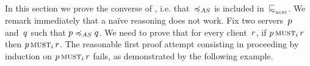 


In this section we prove the converse of ,
i.e. that~$\asleq$ is included in~$\testleqS$. 
We remark immediately that a naïve reasoning does not work.
Fix two servers~$p$ and~$q$ such that $\serverA \asleq \serverB$.
We need to prove that for every client~$r$, if
$\musti{\server}{\client}$ then $\musti{\serverA}{\client}$.
The reasonable first proof attempt consisting in proceeding by induction on
$\musti{\server}{\client}$ fails, as demonstrated by the following example.

